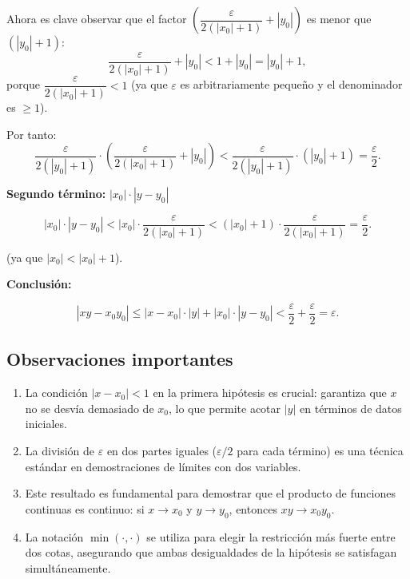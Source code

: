 Ahora es clave observar que el factor $\left(\dfrac{\varepsilon}{2(|x_0| + 1)} + |y_0|\right)$ es menor que $(|y_0| + 1)$:
\[
\frac{\varepsilon}{2(|x_0| + 1)} + |y_0| < 1 + |y_0| = |y_0| + 1,
\]
porque $\dfrac{\varepsilon}{2(|x_0| + 1)} < 1$ (ya que $\varepsilon$ es arbitrariamente pequeño y el denominador es $\geq 1$).

Por tanto:
\[
\frac{\varepsilon}{2(|y_0| + 1)} \cdot \left(\frac{\varepsilon}{2(|x_0| + 1)} + |y_0|\right) < \frac{\varepsilon}{2(|y_0| + 1)} \cdot (|y_0| + 1) = \frac{\varepsilon}{2}.
\]

\textbf{Segundo término:} $|x_0| \cdot |y - y_0|$

\[
|x_0| \cdot |y - y_0| < |x_0| \cdot \frac{\varepsilon}{2(|x_0| + 1)} < (|x_0| + 1) \cdot \frac{\varepsilon}{2(|x_0| + 1)} = \frac{\varepsilon}{2}.
\]

(ya que $|x_0| < |x_0| + 1$).

\textbf{Conclusión:}

\[
|xy - x_0y_0| \leq |x - x_0| \cdot |y| + |x_0| \cdot |y - y_0| < \frac{\varepsilon}{2} + \frac{\varepsilon}{2} = \varepsilon.
\]

\subsection*{Observaciones importantes}

\begin{enumerate}
\item La condición $|x - x_0| < 1$ en la primera hipótesis es crucial: garantiza que $x$ no se desvía demasiado de $x_0$, lo que permite acotar $|y|$ en términos de datos iniciales.

\item La división de $\varepsilon$ en dos partes iguales ($\varepsilon/2$ para cada término) es una técnica estándar en demostraciones de límites con dos variables.

\item Este resultado es fundamental para demostrar que el producto de funciones continuas es continuo: si $x \to x_0$ y $y \to y_0$, entonces $xy \to x_0y_0$.

\item La notación $\min(\cdot, \cdot)$ se utiliza para elegir la restricción más fuerte entre dos cotas, asegurando que ambas desigualdades de la hipótesis se satisfagan simultáneamente.
\end{enumerate}
